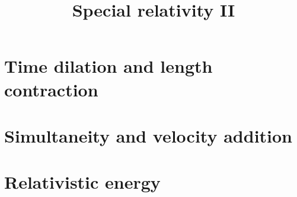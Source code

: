 \documentclass{handout}
\title{Special relativity II}
\begin{document}
\maketitle
\practiceinstructions


\section{Time dilation and length contraction}

\section{Simultaneity and velocity addition}

\section{Relativistic energy}
\end{document}
